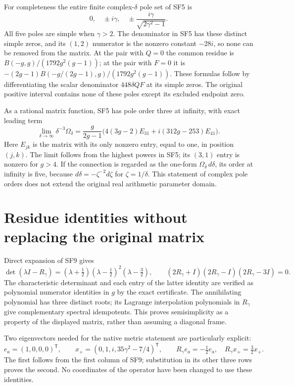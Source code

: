 \documentclass[11pt]{article}
\begin{document}
For completeness the entire finite complex-$\delta$ pole set
of SF5 is
\begin{equation}
 0,\quad\pm i\gamma,\quad
 \pm\frac{i\gamma}{\sqrt{2\gamma^2-1}}.\tag{SF11}
\end{equation}
All five poles are simple when $\gamma>2$. The denominator in
SF5 has these distinct simple zeros, and its $(1,2)$ numerator
is the nonzero constant $-28i$, so none can be removed from the
matrix. At the pair with $Q=0$ the common residue is
$B(-g,g)/(1792g^2(g-1))$; at the pair with $F=0$ it is
$-(2g-1)B(-g/(2g-1),g)/(1792g^2(g-1))$.
These formulas follow by differentiating the scalar denominator
$448\delta QF$ at its simple zeros. The original positive
interval contains none of these poles except its excluded
endpoint zero.

As a rational matrix function, SF5 has pole order three at
infinity, with exact leading term
\[
 \lim_{\delta\to\infty}\delta^{-3}\Omega_\delta
 =\frac{g}{2g-1}\bigl(4(3g-2)E_{31}
                         +i(312g-253)E_{41}\bigr).
\]
Here $E_{jk}$ is the matrix with its only nonzero entry, equal
to one, in position $(j,k)$. The limit follows from the highest
powers in SF5; its $(3,1)$ entry is nonzero for $g>4$.
If the connection is regarded as the one-form
$\Omega_\delta\,d\delta$, its order at infinity is five,
because $d\delta=-\zeta^{-2}d\zeta$ for $\zeta=1/\delta$.
This statement of complex pole orders does not extend the
original real arithmetic parameter domain.

\section{Residue identities without replacing the original matrix}
Direct expansion of SF9 gives
\begin{equation}
 \det(\lambda I-R_\gamma)
   =(\lambda+\tfrac12)(\lambda-\tfrac12)^2(\lambda-\tfrac32),
 \qquad
 (2R_\gamma+I)(2R_\gamma-I)(2R_\gamma-3I)=0.
 \tag{SF12}
\end{equation}
The characteristic determinant and each entry of the latter
identity are verified as polynomial numerator identities in
$g$ by the exact certificate. The annihilating polynomial has
three distinct roots; its Lagrange interpolation polynomials
in $R_\gamma$ give complementary spectral idempotents.
This proves semisimplicity as a property of the displayed
matrix, rather than assuming a diagonal frame.

Two eigenvectors needed for the native metric statement are
particularly explicit:
\begin{equation}
 e_a=(1,0,0,0)^{\mathsf T},\qquad
 x_+=(0,1,i,35\gamma^2-7/4)^{\mathsf T},\qquad
 R_\gamma e_a=-\tfrac12e_a,\quad
 R_\gamma x_+=\tfrac32x_+.
 \tag{SF13}
\end{equation}
The first follows from the first column of SF9; substitution
in its other three rows proves the second. No coordinates of
the operator have been changed to use these identities.
\end{document}
